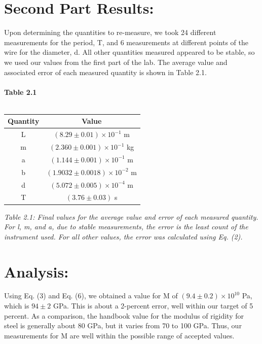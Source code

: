 \documentclass[leqno]{article}
\begin{document}
\section*{Second Part Results:}
Upon determining the quantities to re-measure, we took 24 different measurements for the period, T, and 6 measurements at different points of the wire for the diameter, d.  All other quantities measured appeared to be stable, so we used our values from the first part of the lab.  The average value  and associated error of each measured quantity is shown in Table 2.1.\\\\
\textbf{Table 2.1}\\\\
\begin{tabular}{c|c}
	Quantity & Value\\
	\hline
	L & $(8.29\pm0.01)\times 10^{-1}$ m\\
	m & $(2.360\pm0.001)\times 10^{-1}$ kg\\
	a & $(1.144\pm0.001)\times 10^{-1}$ m\\
	b & $(1.9032\pm0.0018)\times10^{-2}$ m\\
	d & $(5.072\pm0.005)\times 10^{-4}$ m\\
	T & $(3.76\pm0.03)$ s\\
\end{tabular}
\begin{flushleft}
\textit{\small Table 2.1: Final values for the average value and error of each measured quantity.  For l, m, and a, due to stable measurements, the error is the least count of the instrument used.  For all other values, the error was calculated using Eq. (2).}
\end{flushleft}
\section*{Analysis:}
Using Eq. (3) and Eq. (6), we obtained a value for M of $(9.4\pm0.2)\times10^{10}$ Pa, which is $94\pm2$ GPa.  This is about a 2-percent error, well within our target of 5 percent.  As a comparison, the handbook value for the modulus of rigidity for steel is generally about 80 GPa, but it varies from 70 to 100 GPa.  Thus, our measurements for M are well within the possible range of accepted values.
\end{document}
